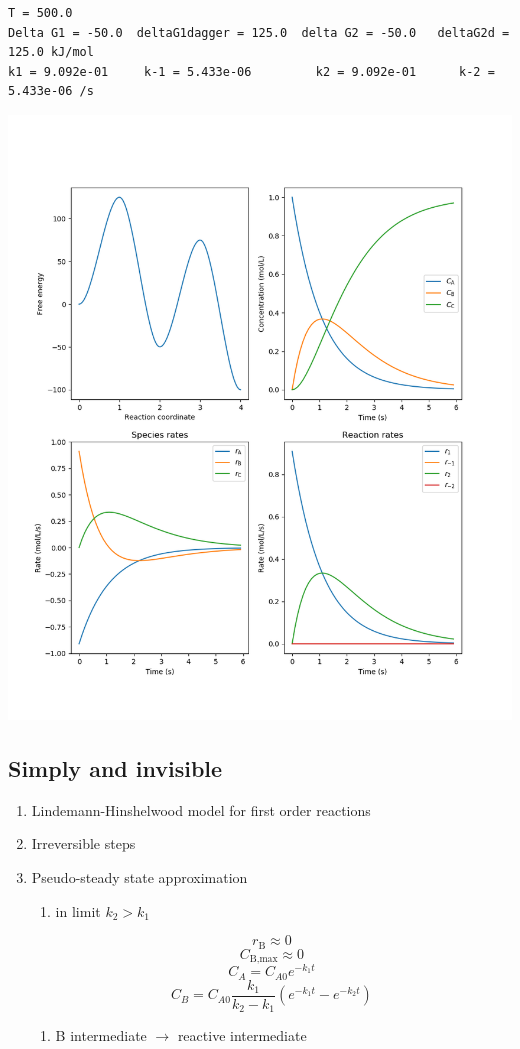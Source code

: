\documentclass[11pt]{article}
\begin{document}
\begin{verbatim}
T = 500.0
Delta G1 = -50.0  deltaG1dagger = 125.0  delta G2 = -50.0   deltaG2d = 125.0 kJ/mol
k1 = 9.092e-01     k-1 = 5.433e-06         k2 = 9.092e-01      k-2 = 5.433e-06 /s
\end{verbatim}


\begin{center}
\includegraphics[width=.9\linewidth]{./Images/ABC-rxn.png}
\end{center}
\subsection{Simply and invisible}
\label{sec:org4399ce3}
\begin{enumerate}
\item Lindemann-Hinshelwood model for first order reactions
\item Irreversible steps
\item Pseudo-steady state approximation
\begin{enumerate}
\item {} in limit \(k_2 > k_1\)
\end{enumerate}
\[ r_{\text{B}} \approx 0 \]     \[C_\text{B,max} \approx 0 \]
  \[C_A = C_{A0} e^{-k_1 t}\]    \[C_B= C_{A0}\frac{k_1}{k_2-k_1} \left ( e^{-k_1 t} - e^{-k_2 t} \right ) \]
\begin{enumerate}
\item B intermediate \(\rightarrow\) reactive intermediate
\end{enumerate}
\end{enumerate}
\end{document}
